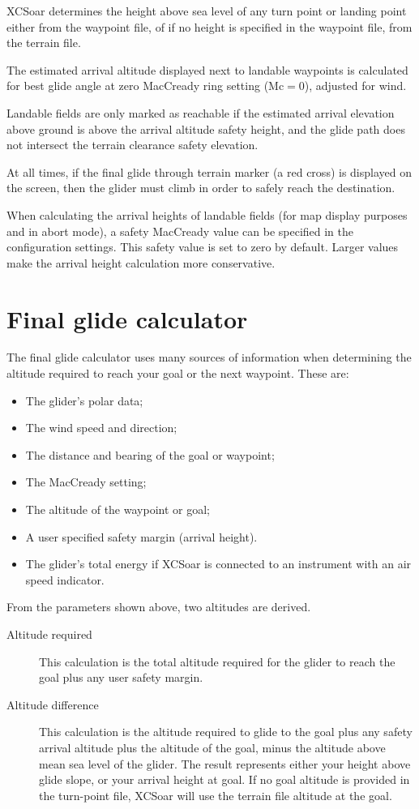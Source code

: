 \documentclass[a4paper,12pt]{refrep}
\begin{document}
XCSoar determines the height above sea level of any turn point or
landing point either from the waypoint file, of if no height is
specified in the waypoint file, from the terrain file.

The estimated arrival altitude displayed next to landable waypoints is
calculated for best glide angle at zero MacCready ring setting
(Mc$=0$), adjusted for wind.

Landable fields are only marked as reachable if the estimated arrival
elevation above ground is above the arrival altitude safety height,
and the glide path does not intersect the terrain clearance safety
elevation.

At all times, if the final glide through terrain marker (a red
cross) is displayed on the screen, then the glider must climb in order
to safely reach the destination.

When calculating the arrival heights of landable fields (for map
display purposes and in abort mode), a safety MacCready value can be
specified in the configuration settings.  This safety value is set to
zero by default.  Larger values make the arrival height calculation
more conservative.

\section{Final glide calculator}

The final glide calculator uses many sources of information when
determining the altitude required to reach your goal or the next
waypoint. These are:

\begin{itemize}
\item The glider's polar data;
\item The wind speed and direction;
\item The distance and bearing of the goal or waypoint;
\item The MacCready setting;
\item The altitude of the waypoint or goal;
\item A user specified safety margin (arrival height).
\item The glider's total energy if XCSoar is connected to
  an instrument with an air speed indicator.
\end{itemize}

From the parameters shown above, two altitudes are derived.
\begin{description}
\item[Altitude required]
This calculation is the total altitude required for the glider to
reach the goal plus any user safety margin. 
\item[Altitude difference]
This calculation is the altitude required to glide to the goal plus
any safety arrival altitude plus the altitude of the goal, minus the
altitude above mean sea level of the glider.  The result represents
either your height above glide slope, or your arrival height at goal.
If no goal altitude is provided in the turn-point file, XCSoar will use
the terrain file altitude at the goal.
\end{description}
\end{document}
